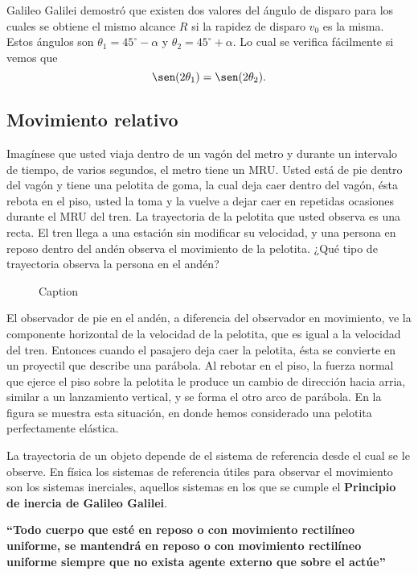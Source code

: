 Galileo Galilei demostró que existen dos valores del ángulo de disparo para los cuales se obtiene el mismo alcance $R$ si la rapidez de disparo $v_0$ es la misma. Estos ángulos son $\theta_1 = 45^\circ - \alpha$ y $\theta_2 = 45^\circ + \alpha$. Lo cual se verifica fácilmente si vemos que
$$\sen(2\theta_1) = \sen(2\theta_2).$$

\subsection{Movimiento relativo}

Imagínese que usted viaja dentro de un vagón del metro y durante un intervalo de tiempo, de varios segundos, el metro tiene un MRU. Usted está de pie dentro del vagón y tiene una pelotita de goma, la cual deja caer dentro del vagón, ésta rebota en el piso, usted la toma y la vuelve a dejar caer en repetidas ocasiones durante el MRU del tren. La trayectoria de la pelotita que usted observa es una recta. El tren llega a una estación sin modificar su velocidad, y una persona en reposo dentro del andén observa el movimiento de la pelotita. ¿Qué tipo de trayectoria observa la persona en el andén?
\begin{figure}
    \centering
    
    \caption{Caption}
    \label{fig:enter-label}
\end{figure}

El observador de pie en el andén, a diferencia del observador en movimiento, ve la componente horizontal de la velocidad de la pelotita, que es igual a la velocidad del tren. Entonces cuando el pasajero deja caer la pelotita, ésta se convierte en un proyectil que describe una parábola. Al rebotar en el piso, la fuerza normal que ejerce el piso sobre la pelotita le produce un cambio de dirección hacia arria, similar a un lanzamiento vertical, y se forma el otro arco de parábola. En la figura se muestra esta situación, en donde hemos considerado una pelotita perfectamente elástica.

La trayectoria de un objeto depende de el sistema de referencia desde el cual se le observe. En física los sistemas de referencia útiles para observar el movimiento son los sistemas inerciales, aquellos sistemas en los que se cumple el \textbf{Principio de inercia de Galileo Galilei}.

\textbf{“Todo cuerpo que esté en reposo o con movimiento rectilíneo uniforme, se mantendrá en reposo o con movimiento rectilíneo uniforme siempre que no exista agente externo que sobre el actúe”}

